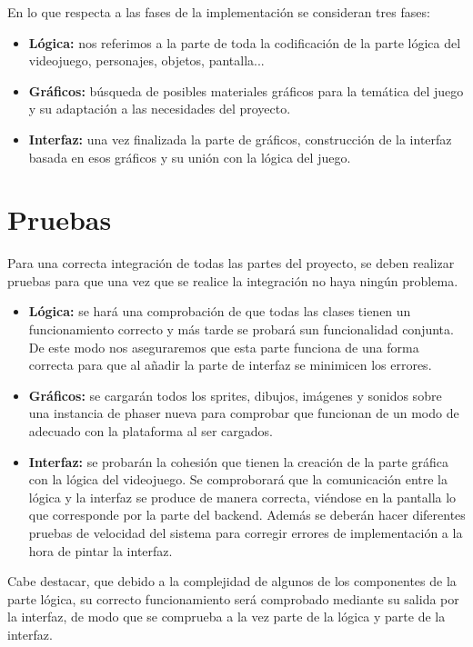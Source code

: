 \documentclass[palatino]{apuntes}
\begin{document}
En lo que respecta a las fases de la implementación se consideran tres fases:

\begin{itemize}
	\item \textbf{Lógica:} nos referimos a la parte de toda la codificación de la parte lógica del videojuego, personajes, objetos, pantalla...
	\item \textbf{Gráficos:} búsqueda de posibles materiales gráficos para la temática del juego y su adaptación a las necesidades del proyecto.
	\item \textbf{Interfaz:} una vez finalizada la parte de gráficos, construcción de la interfaz basada en esos gráficos y su unión con la lógica del juego.
\end{itemize}


\chapter{Pruebas}
Para una correcta integración de todas las partes del proyecto, se deben realizar pruebas para que una vez que se realice la integración no haya ningún problema.

\begin{itemize}
	\item \textbf{Lógica:} se hará una comprobación de que todas las clases tienen un funcionamiento correcto y más tarde se probará sun funcionalidad conjunta. De este modo nos aseguraremos que esta parte funciona de una forma correcta para que al añadir la parte de interfaz se minimicen los errores.
	\item \textbf{Gráficos:} se cargarán todos los sprites, dibujos, imágenes y sonidos sobre una instancia de phaser nueva para comprobar que funcionan de un modo de adecuado con la plataforma al ser cargados.
	\item \textbf{Interfaz:} se probarán la cohesión que tienen la creación de la parte gráfica con la lógica del videojuego. Se comproborará que la comunicación entre la lógica y la interfaz se produce de manera correcta, viéndose en la pantalla lo que corresponde por la parte del backend. Además se deberán hacer diferentes pruebas de velocidad del sistema para corregir errores de implementación a la hora de pintar la interfaz.
\end{itemize}

Cabe destacar, que debido a la complejidad de algunos de los componentes de la parte lógica, su correcto funcionamiento será comprobado mediante su salida por la interfaz, de modo que se comprueba a la vez parte de la lógica y parte de la interfaz.
\end{document}
